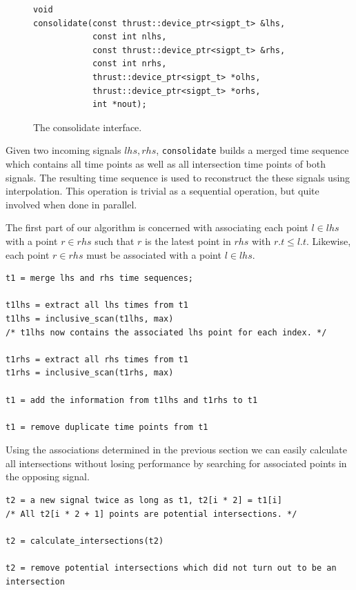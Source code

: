 \documentclass[a4paper,10pt]{article}
\begin{document}
\begin{figure}[H]
\begin{lstlisting}
void
consolidate(const thrust::device_ptr<sigpt_t> &lhs,
            const int nlhs,
            const thrust::device_ptr<sigpt_t> &rhs,
            const int nrhs,
            thrust::device_ptr<sigpt_t> *olhs,
            thrust::device_ptr<sigpt_t> *orhs,
            int *nout);
\end{lstlisting}
\caption{
\label{fig:parallel_consolidate}
The consolidate interface.}
\end{figure}

Given two incoming signals $lhs, rhs$, \lstinline|consolidate| builds a
merged time sequence which contains all time points as well as all intersection
time points of both signals. The resulting time sequence is used to reconstruct
the these signals using interpolation. This operation is trivial as a sequential
operation, but quite involved when done in parallel.

The first part of our algorithm is concerned with associating each point $l \in lhs$
with a point $r \in rhs$ such that $r$ is the latest point in $rhs$ with $r.t \leq l.t$. Likewise, each point $r \in rhs$ must be associated with a point $l \in lhs$.

\begin{lstlisting}
t1 = merge lhs and rhs time sequences;

t1lhs = extract all lhs times from t1
t1lhs = inclusive_scan(t1lhs, max)
/* t1lhs now contains the associated lhs point for each index. */

t1rhs = extract all rhs times from t1
t1rhs = inclusive_scan(t1rhs, max)

t1 = add the information from t1lhs and t1rhs to t1

t1 = remove duplicate time points from t1
\end{lstlisting}

Using the associations determined in the previous section we can easily calculate
all intersections without losing performance by searching for associated points
in the opposing signal.

\begin{lstlisting}
t2 = a new signal twice as long as t1, t2[i * 2] = t1[i]
/* All t2[i * 2 + 1] points are potential intersections. */

t2 = calculate_intersections(t2)

t2 = remove potential intersections which did not turn out to be an intersection
\end{lstlisting}
\end{document}
